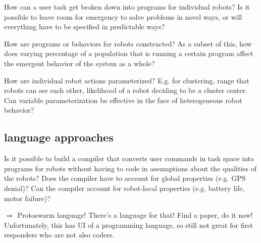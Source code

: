 \documentclass[]{article}
\begin{document}
How can a user task get broken down into programs for individual robots?
Is it possible to leave room for emergency to solve problems in novel ways, or will everything have to be specified in predictable ways?

How are programs or behaviors for robots constructed? 
As a subset of this, how does varying percentage of a population that is running a certain program affect the emergent behavior of the system as a whole? 

How are individual robot actions parameterized? 
E.g. for clustering, range that robots can see each other, likelihood of a robot deciding to be a cluster center.  
Can variable parameterization be effective in the face of heterogeneous robot behavior?

\subsection {language approaches}

Is it possible to build a compiler that converts user commands in task space into programs for robots without having to code in assumptions about the qualities of the robots? Does the compiler have to account for global properties (e.g. GPS denial)? Can the compiler account for robot-local properties (e.g. battery life, motor failure)?

$\Rightarrow$ Protoswarm language! There's a language for that! Find a paper, do it now! Unfortunately, this has UI of a programming language, so still not great for first responders who are not also coders. 
\end{document}
